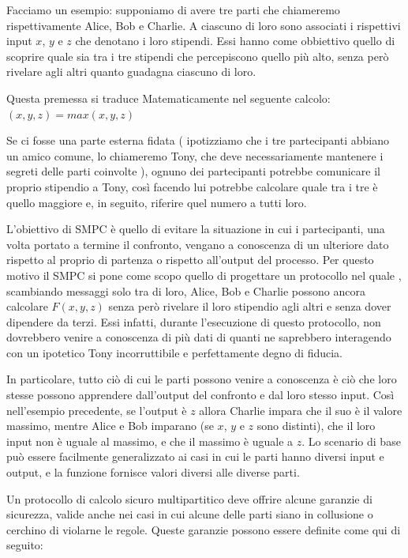 \documentclass[
]{book}
\begin{document}
Facciamo un esempio: supponiamo di avere tre parti che chiameremo rispettivamente Alice, Bob e Charlie. A ciascuno di loro sono associati i rispettivi input \(x\), \(y\) e \(z\) che denotano i loro stipendi. Essi hanno come obbiettivo quello di scoprire quale sia tra i tre stipendi che percepiscono quello più alto, senza però rivelare agli altri quanto guadagna ciascuno di loro.

Questa premessa si traduce Matematicamente nel seguente calcolo: \((x,y,z) = max(x, y, z)\)

Se ci fosse una parte esterna fidata ( ipotizziamo che i tre partecipanti abbiano un amico comune, lo chiameremo Tony, che deve necessariamente mantenere i segreti delle parti coinvolte ), ognuno dei partecipanti potrebbe comunicare il proprio stipendio a Tony, così facendo lui potrebbe calcolare quale tra i tre è quello maggiore e, in seguito, riferire quel numero a tutti loro.

L'obiettivo di SMPC è quello di evitare la situazione in cui i partecipanti, una volta portato a termine il confronto, vengano a conoscenza di un ulteriore dato rispetto al proprio di partenza o rispetto all'output del processo. Per questo motivo il SMPC si pone come scopo quello di progettare un protocollo nel quale , scambiando messaggi solo tra di loro, Alice, Bob e Charlie possono ancora calcolare \(F(x, y, z)\) senza però rivelare il loro stipendio agli altri e senza dover dipendere da terzi. Essi infatti, durante l'esecuzione di questo protocollo, non dovrebbero venire a conoscenza di più dati di quanti ne saprebbero interagendo con un ipotetico Tony incorruttibile e perfettamente degno di fiducia.

In particolare, tutto ciò di cui le parti possono venire a conoscenza è ciò che loro stesse possono apprendere dall'output del confronto e dal loro stesso input. Così nell'esempio precedente, se l'output è \(z\) allora Charlie impara che il suo è il valore massimo, mentre Alice e Bob imparano (se \(x\), \(y\) e \(z\) sono distinti), che il loro input non è uguale al massimo, e che il massimo è uguale a \(z\). Lo scenario di base può essere facilmente generalizzato ai casi in cui le parti hanno diversi input e output, e la funzione fornisce valori diversi alle diverse parti.

\newpage

Un protocollo di calcolo sicuro multipartitico deve offrire alcune garanzie di sicurezza, valide anche nei casi in cui alcune delle parti siano in collusione o cerchino di violarne le regole. Queste garanzie possono essere definite come qui di seguito:
\end{document}
